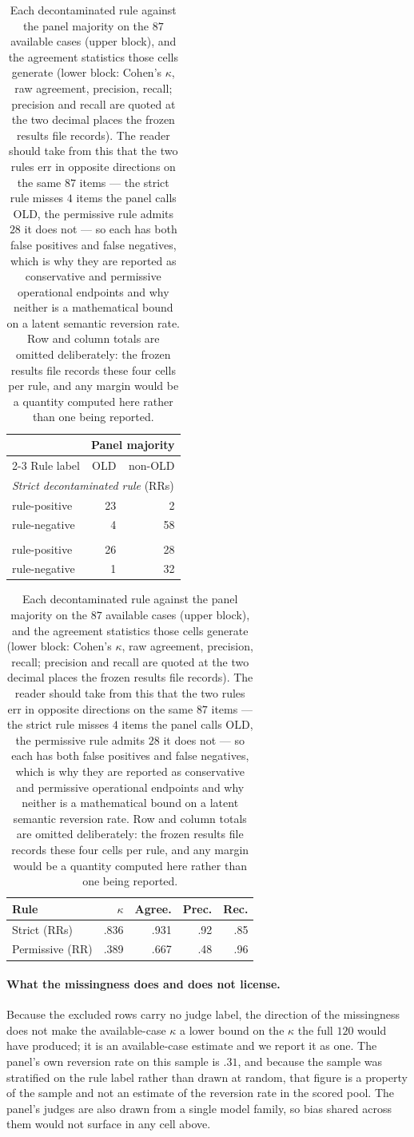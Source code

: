 \documentclass[letterpaper]{article}
\begin{document}
\begin{table}[tb]
\centering
\begin{tabular}{lrr}
\toprule
 & \multicolumn{2}{c}{Panel majority} \\
\cmidrule(l){2-3}
Rule label & OLD & non-OLD \\
\midrule
\multicolumn{3}{l}{\emph{Strict decontaminated rule} (RRs)} \\
\quad rule-positive & 23 & 2 \\
\quad rule-negative & 4 & 58 \\
\addlinespace
\multicolumn{3}{l}{\emph{Permissive decontaminated rule} (RR)} \\
\quad rule-positive & 26 & 28 \\
\quad rule-negative & 1 & 32 \\
\bottomrule
\end{tabular}

\medskip

\begin{tabular}{lrrrr}
\toprule
Rule & \(\kappa\) & Agree. & Prec. & Rec. \\
\midrule
Strict (RRs) & .836 & .931 & .92 & .85 \\
Permissive (RR) & .389 & .667 & .48 & .96 \\
\bottomrule
\end{tabular}
\caption{Each decontaminated rule against the panel majority on the \(87\)
available cases (upper block), and the agreement statistics those cells
generate (lower block: Cohen's \(\kappa\), raw agreement, precision, recall;
precision and recall are quoted at the two decimal places the frozen results
file records).  The reader should take from this that the two rules err in
opposite directions on the same \(87\) items --- the strict rule misses \(4\)
items the panel calls OLD, the permissive rule admits \(28\) it does not --- so
each has both false positives and false negatives, which is why they are
reported as conservative and permissive operational endpoints and why neither
is a mathematical bound on a latent semantic reversion rate.  Row and column
totals are omitted deliberately: the frozen results file records these four
cells per rule, and any margin would be a quantity computed here rather than
one being reported.}
\label{tab:s2b-rules}
\end{table}

\paragraph{What the missingness does and does not license.}
Because the excluded rows carry no judge label, the direction of the
missingness does not make the available-case \(\kappa\) a lower bound on the
\(\kappa\) the full \(120\) would have produced; it is an available-case
estimate and we report it as one.  The panel's own reversion rate on this sample
is \(.31\), and because the sample was stratified on the rule label rather than
drawn at random, that figure is a property of the sample and not an estimate of
the reversion rate in the scored pool.  The panel's judges are also drawn from a
single model family, so bias shared across them would not surface in any cell
above.
\end{document}
